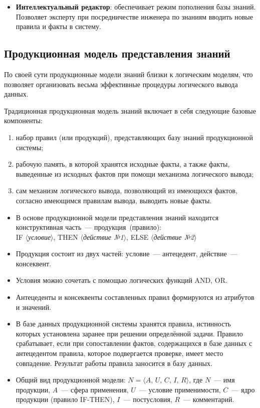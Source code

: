 \documentclass[a4paper,final]{article}
\begin{document}
\begin{itemize}
	\item \textbf{Интеллектуальный редактор}: обеспечивает режим пополнения базы знаний. Позволяет эксперту при посредничестве инженера по знаниям вводить новые правила и факты в систему.
\end{itemize}


\subsection{Продукционная модель представления знаний}

По своей сути продукционные модели знаний близки к логическим моделям, что позволяет организовать весьма эффективные процедуры логического вывода данных.

Традиционная продукционная модель знаний включает в себя следующие базовые компоненты:

\begin{enumerate}
	\item набор правил (или продукций), представляющих базу знаний продукционной системы;
	\item рабочую память, в которой хранятся исходные факты, а также факты, выведенные из исходных фактов при помощи механизма логического вывода;
	\item сам механизм логического вывода, позволяющий из имеющихся фактов, согласно имеющимся правилам вывода, выводить новые факты.
\end{enumerate}

\begin{itemize}
	\item В основе продукционной модели представления знаний находится конструктивная часть~--- продукция~(правило):\\[4pt]
	IF $\langle$\textit{условие}$\rangle$,\; THEN $\langle$\textit{действие №1}$\rangle$,\; ELSE $\langle$\textit{действие №2}$\rangle$

	\item Продукция состоит из двух частей: условие~--- антецедент, действие~--- консеквент.

	\item Условия можно сочетать с помощью логических функций AND, OR.

	\item Антецеденты и консеквенты составленных правил формируются из атрибутов и значений.

	\item В базе данных продукционной системы хранятся правила, истинность которых установлена заранее при решении определённой задачи. Правило срабатывает, если при сопоставлении фактов, содержащихся в базе данных с антецедентом правила, которое подвергается проверке, имеет место совпадение. Результат работы правила заносится в базу данных.

	\item Общий вид продукционной модели: $N = \langle A,\, U,\, C,\, I,\, R \rangle$, где $N$~--- имя продукции, $A$~--- сфера применения, $U$~--- условие применимости, $C$~--- ядро продукции (правило IF-THEN), $I$~--- постусловия, $R$~--- комментарий.
\end{itemize}
\end{document}
